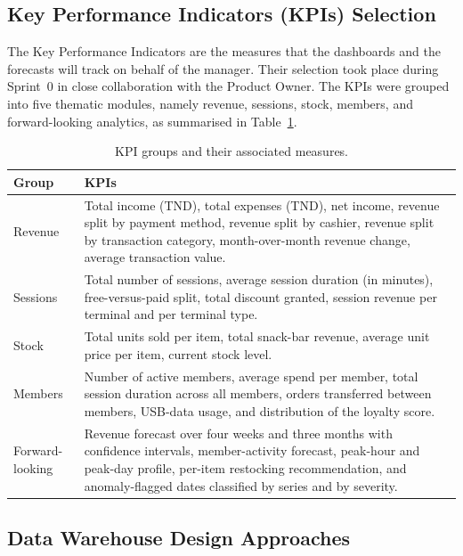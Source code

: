 \documentclass[12pt, a4paper]{report}
\begin{document}
\subsection{Key Performance Indicators (KPIs) Selection}

The Key Performance Indicators are the measures that the dashboards and
the forecasts will track on behalf of the manager. Their selection took
place during Sprint~0 in close collaboration with the Product Owner. The
KPIs were grouped into five thematic modules, namely revenue, sessions,
stock, members, and forward-looking analytics, as summarised in
Table~\ref{tab:kpis}.

\begin{table}[H]
  \centering
  \caption{KPI groups and their associated measures.\label{tab:kpis}}
  \begin{tabular}{p{3cm} p{10cm}}
    \toprule
    \textbf{Group} & \textbf{KPIs} \\
    \midrule
    Revenue
      & Total income (TND), total expenses (TND), net income, revenue
        split by payment method, revenue split by cashier, revenue split
        by transaction category, month-over-month revenue change,
        average transaction value. \\[4pt]
    Sessions
      & Total number of sessions, average session duration (in minutes),
        free-versus-paid split, total discount granted, session revenue
        per terminal and per terminal type. \\[4pt]
    Stock
      & Total units sold per item, total snack-bar revenue, average unit
        price per item, current stock level. \\[4pt]
    Members
      & Number of active members, average spend per member, total
        session duration across all members, orders transferred between
        members, USB-data usage, and distribution of the loyalty score. \\[4pt]
    Forward-looking
      & Revenue forecast over four weeks and three months with
        confidence intervals, member-activity forecast, peak-hour and
        peak-day profile, per-item restocking recommendation, and
        anomaly-flagged dates classified by series and by severity. \\
    \bottomrule
  \end{tabular}
\end{table}

\subsection{Data Warehouse Design Approaches}
\end{document}
